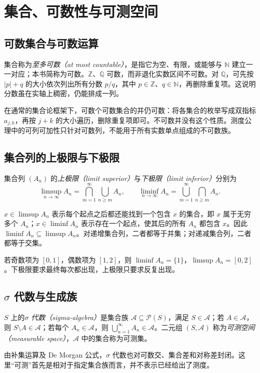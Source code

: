 \setcounter{chapter}{1} %
\chapter{集合、可数性与可测空间}
\label{chap:mt-sets}

\section{可数集合与可数运算}
集合称为\emph{至多可数（at most countable）}，是指它为空、有限，或能够与 $\mathbb N$ 建立一一对应；本书简称为可数。$\mathbb Z$、$\mathbb Q$ 可数，而非退化实数区间不可数。对 $\mathbb Q$，可先按 $|p|+q$ 的大小依次列出所有分数 $p/q$，其中 $p\in\mathbb Z$、$q\in\mathbb N$，再删除重复项。这说明分数虽在实轴上稠密，仍能排成一列。

在通常的集合论框架下，可数个可数集合的并仍可数：将各集合的枚举写成双指标 $a_{j,k}$，再按 $j+k$ 的大小遍历，删除重复项即可。不可数并没有这个性质。测度公理中的可列可加性只针对可数列，不能用于所有实数单点组成的不可数族。

\section{集合列的上极限与下极限}
\begin{definition}
集合列 $(A_n)$ 的\emph{上极限（limit superior）}与\emph{下极限（limit inferior）}分别为
\begin{equation}
 \limsup_{n\to\infty}A_n=\bigcap_{m=1}^{\infty}\bigcup_{n\geq m}A_n,\qquad
 \liminf_{n\to\infty}A_n=\bigcup_{m=1}^{\infty}\bigcap_{n\geq m}A_n.
 \label{eq:mt-set-limits}
\end{equation}
\end{definition}
$x\in\limsup A_n$ 表示每个起点之后都还能找到一个包含 $x$ 的集合，即 $x$ 属于无穷多个 $A_n$；$x\in\liminf A_n$ 表示存在一个起点，使其后的所有 $A_n$ 都包含 $x$。因此 $\liminf A_n\subseteq\limsup A_n$。对递增集合列，二者都等于并集；对递减集合列，二者都等于交集。

\begin{example}
若奇数项为 $[0,1]$，偶数项为 $[1,2]$，则 $\liminf A_n=\{1\}$，$\limsup A_n=[0,2]$。下极限要求最终每次都出现，上极限只要求反复出现。
\end{example}

\section{$\sigma$ 代数与生成族}
\begin{definition}
$S$ 上的\emph{$\sigma$ 代数（sigma-algebra）}是集合族 $\mathcal A\subseteq\mathcal P(S)$，满足 $S\in\mathcal A$；若 $A\in\mathcal A$，则 $S\setminus A\in\mathcal A$；若每个 $A_n\in\mathcal A$，则 $\bigcup_{n=1}^{\infty}A_n\in\mathcal A$。二元组 $(S,\mathcal A)$ 称为\emph{可测空间（measurable space）}，$\mathcal A$ 中的集合称为可测集。
\end{definition}
由补集运算及 De Morgan 公式，$\sigma$ 代数也对可数交、集合差和对称差封闭。这里“可测”首先是相对于指定集合族而言，并不表示已经给出了测度。

